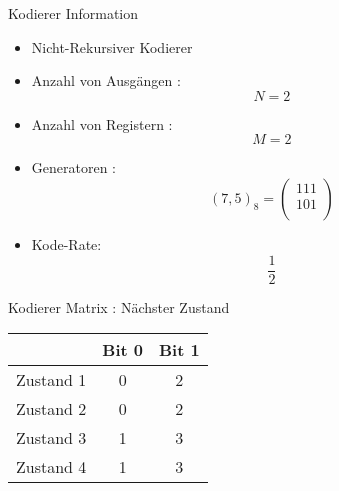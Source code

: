 \begin{frame}{Kodierer Information}

\begin{itemize}
\tightlist
\item
  Nicht-Rekursiver Kodierer
\item
  Anzahl von Ausgängen : \[N=2\]
\item
  Anzahl von Registern : \[M=2\]
\item
  Generatoren : \[(7,5)_8 = \begin{pmatrix}111 \\ 101 \\ \end{pmatrix}\]
\item
  Kode-Rate: \[\frac{1}{2}\]
\end{itemize}

\end{frame}

\begin{frame}[fragile]{Kodierer Matrix : Nächster Zustand}

\begin{Shaded}
\begin{Highlighting}[]
\StringTok{ }
\StringTok{ }\NormalTok{(}\NormalTok{, }\NormalTok{)}
\StringTok{ }\NormalTok{(}\NormalTok{:}\NormalTok{(next.table)[}\NormalTok{])}
\StringTok{ }\NormalTok{(}
\NormalTok{)}
\end{Highlighting}
\end{Shaded}

\begin{longtable}[c]{@{}lcc@{}}
\toprule
& Bit 0 & Bit 1\tabularnewline
\midrule
\endhead
Zustand 1 & 0 & 2\tabularnewline
Zustand 2 & 0 & 2\tabularnewline
Zustand 3 & 1 & 3\tabularnewline
Zustand 4 & 1 & 3\tabularnewline
\bottomrule
\end{longtable}

\end{frame}

